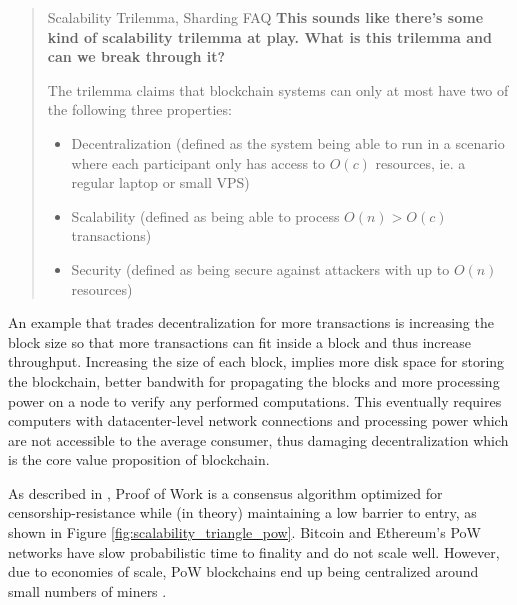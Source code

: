 \begin{quote}{Scalability Trilemma, Sharding FAQ}
    \textbf{This sounds like there’s some kind of scalability trilemma at play. What is this trilemma and can we break through it?}

    The trilemma claims that blockchain systems can only at most have two of the following three properties:

    \begin{itemize}
        \item Decentralization (defined as the system being able to run in a scenario where each participant only has access to $O(c)$ resources, ie. a regular laptop or small VPS)
        \item Scalability (defined as being able to process $O(n) > O(c)$ transactions)
        \item Security (defined as being secure against attackers with up to $O(n)$ resources)
    \end{itemize}
\end{quote}

An example that trades decentralization for more transactions is increasing the block size so that more transactions can fit inside a block and thus increase throughput. Increasing the size of each block, implies more disk space for storing the blockchain, better bandwith for propagating the blocks and more processing power on a node to verify any performed computations. This eventually requires computers with datacenter-level network connections and processing power which are not accessible to the average consumer, thus damaging decentralization which is the core value proposition of blockchain. %

As described in \cite{scaling-trustless-models}, Proof of Work is a consensus algorithm optimized for censorship-resistance while (in theory) maintaining a low barrier to entry, as shown in Figure \ref{fig:scalability_triangle_pow}. Bitcoin and Ethereum's PoW networks have slow probabilistic time to finality and do not scale well. However, due to economies of scale, PoW blockchains end up being centralized around small numbers of miners \cite{Gencer2018DecentralizationIB}. 

